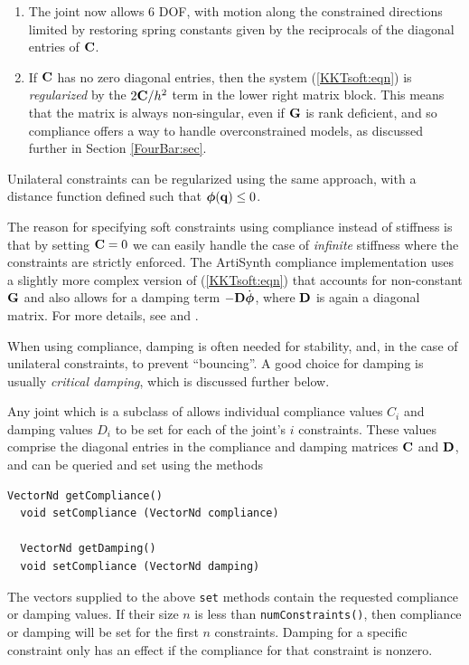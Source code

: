 \begin{enumerate}

\item The joint now allows 6 DOF, with motion along the constrained directions
limited by restoring spring constants given by the reciprocals of the
diagonal entries of ${\bf C}$.

\item If ${\bf C}$ has no zero diagonal entries, then the system
(\ref{KKTsoft:eqn}) is {\it regularized} by the $2 {\bf C}/h^2$ term in the
lower right matrix block. This means that the matrix is always
non-singular, even if ${\bf G}$ is rank deficient, and so compliance offers
a way to handle overconstrained models, as discussed further in
Section \ref{FourBar:sec}.

\end{enumerate}

Unilateral constraints can be regularized using the same approach,
with a distance function defined such that $\boldsymbol\phi({\bf q}) \le 0$.  

The reason for specifying soft constraints using compliance instead of
stiffness is that by setting ${\bf C} = 0$ we can easily handle the case of
{\it infinite} stiffness where the constraints are strictly enforced.
The ArtiSynth compliance implementation uses a slightly more complex
version of (\ref{KKTsoft:eqn}) that accounts for non-constant ${\bf G}$ and
also allows for a damping term $-{\bf D} \dot{\boldsymbol\phi}$, where ${\bf D}$ is again a
diagonal matrix.  For more details, see \cite{lacoursiere2007ghosts}
and \cite{servin2006interactive}.

When using compliance, damping is often needed for stability, and, in
the case of unilateral constraints, to prevent ``bouncing''.  A good
choice for damping is usually {\it critical damping}, which is
discussed further below.

Any joint which is a subclass of
 allows
individual compliance values $C_i$ and damping values $D_i$ to be set
for each of the joint's $i$ constraints. These values comprise the
diagonal entries in the compliance and damping matrices ${\bf C}$ and ${\bf D}$,
and can be queried and set using the methods
%
\begin{lstlisting}[]
  VectorNd getCompliance()
  void setCompliance (VectorNd compliance)

  VectorNd getDamping()
  void setCompliance (VectorNd damping)
\end{lstlisting}
%
The vectors supplied to the above {\tt set} methods contain the
requested compliance or damping values. If their size $n$ is less than
{\tt numConstraints()}, then compliance or damping will be set for the
first $n$ constraints.  Damping for a specific constraint only has an
effect if the compliance for that constraint is nonzero.

